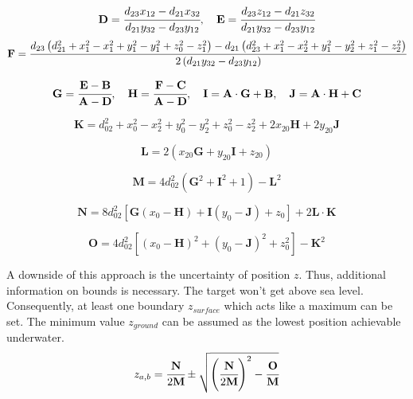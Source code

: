 \begin{equation}
	\mathbf{D}=\cfrac{d_{23}x_{12}-d_{21}x_{32}}{d_{21}y_{32}-d_{23}y_{12}},~~~
	\mathbf{E}=\cfrac{d_{23}z_{12}-d_{21}z_{32}}{d_{21}y_{32}-d_{23}y_{12}}
\end{equation}	
\begin{equation}
	\mathbf{F}=\cfrac{d_{23}\left(d_{21}^2+x_1^2-x_1^2+y_1^2-y_1^2+z_0^2-z_1^2\right)-d_{21}\left(d_{23}^2+x_1^2-x_2^2+y_1^2-y_2^2+z_1^2-z_2^2\right)}{2\left(d_{21}y_{32}-d_{23}y_{12}\right)}
\end{equation}	

\begin{equation}
	\mathbf{G}=\cfrac{\mathbf{E}-\mathbf{B}}{\mathbf{A}-\mathbf{D}},~~~
	\mathbf{H}=\cfrac{\mathbf{F}-\mathbf{C}}{\mathbf{A}-\mathbf{D}},~~~
	\mathbf{I}=\mathbf{A}\cdot \mathbf{G}+\mathbf{B},~~~
	\mathbf{J}=\mathbf{A}\cdot \mathbf{H}+\mathbf{C}
\end{equation}	

\begin{equation}
	\mathbf{K}=d_{02}^2+x_0^2-x_2^2+y_0^2-y_2^2+z_0^2-z_2^2+2x_{20}\mathbf{H}+2y_{20}\mathbf{J}
\end{equation}	

\begin{equation}
	\mathbf{L}=2\left(x_{20}\mathbf{G}+y_{20}\mathbf{I}+z_{20}\right)
\end{equation}	

\begin{equation}
	\mathbf{M}=4d_{02}^2\left(\mathbf{G}^2+\mathbf{I}^2+1\right)-\mathbf{L}^2
\end{equation}	

\begin{equation}
	\mathbf{N}=8d_{02}^2\left[\mathbf{G}\left(x_0-\mathbf{H}\right)+\mathbf{I}\left(y_0-\mathbf{J}\right)+z_0\right]+2\mathbf{L}\cdot\mathbf{K}
\end{equation}	

\begin{equation}
	\mathbf{O}=4d_{02}^2\left[\left(x_0-\mathbf{H}\right)^2+\left(y_0-\mathbf{J}\right)^2+z_0^2\right]-\mathbf{K}^2
\end{equation}	

A downside of this approach is the uncertainty of position $z$. Thus, additional information on bounds is necessary. The target won't get above sea level. Consequently, at least one boundary $z_{surface}$ which acts like a maximum can be set. The minimum value $z_{ground}$ can be assumed as the lowest position achievable underwater. 
\begin{equation}
	z_{a,b}=\cfrac{\mathbf{N}}{2\mathbf{M}}\pm\sqrt{\left(\cfrac{\mathbf{N}}{2\mathbf{M}}\right)^2-\cfrac{\mathbf{O}}{\mathbf{M}}}
\end{equation}	

